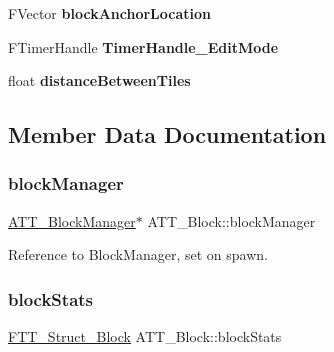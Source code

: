 \begin{DoxyCompactItemize}
\mbox{\label{class_a_t_t___block_a670df2dfc5e784caecbdf2c948a35895}} 
F\+Vector {\bfseries block\+Anchor\+Location}
\item 
\mbox{\label{class_a_t_t___block_aea7c365ec786865e3dac86ee498cdc60}} 
F\+Timer\+Handle {\bfseries Timer\+Handle\+\_\+\+Edit\+Mode}
\item 
\mbox{\label{class_a_t_t___block_a0b8f001d70baa32ba5905a9386df180f}} 
float {\bfseries distance\+Between\+Tiles}
\end{DoxyCompactItemize}


\subsection{Member Data Documentation}
\mbox{\label{class_a_t_t___block_ae6c7b24dcdb93d9b937ba9157d10e907}} 
\subsubsection{\texorpdfstring{blockManager}{blockManager}}
{\footnotesize\ttfamily \mbox{\hyperlink{class_a_t_t___block_manager}{A\+T\+T\+\_\+\+Block\+Manager}}$\ast$ A\+T\+T\+\_\+\+Block\+::block\+Manager\hspace{0.3cm}{\ttfamily [protected]}}



Reference to Block\+Manager, set on spawn. 

\mbox{\label{class_a_t_t___block_aecfe89c2093f6182e9e8f47ce19d6837}} 
\subsubsection{\texorpdfstring{blockStats}{blockStats}}
{\footnotesize\ttfamily \mbox{\hyperlink{struct_f_t_t___struct___block}{F\+T\+T\+\_\+\+Struct\+\_\+\+Block}} A\+T\+T\+\_\+\+Block\+::block\+Stats\hspace{0.3cm}{\ttfamily [protected]}}



